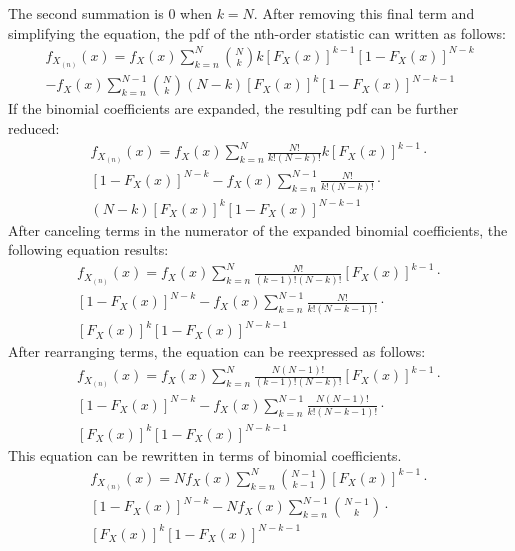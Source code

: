 \documentclass[conference]{IEEEtran}
\begin{document}
The second summation is 0 when $k=N$. After removing this final term and simplifying the equation, the pdf of the nth-order statistic can written as follows:
\begin{equation}
\begin{gathered}
f_{X_{(n)}}(x) = f_X(x)\sum_{k=n}^{N}\binom{N}{k}k[F_X(x)]^{k-1}[1-F_X(x)]^{N-k}\\
- f_X(x)\sum_{k=n}^{N-1}\binom{N}{k}(N-k)[F_X(x)]^{k}[1-F_X(x)]^{N-k-1}
\end{gathered}
\end{equation}
If the binomial coefficients are expanded, the resulting pdf can be further reduced:
\begin{equation}
\begin{gathered}
f_{X_{(n)}}(x) = f_X(x)\sum_{k=n}^{N}\frac{N!}{k!(N-k)!}k[F_X(x)]^{k-1}\cdot\\
[1-F_X(x)]^{N-k} - f_X(x)\sum_{k=n}^{N-1}\frac{N!}{k!(N-k)!}\cdot\\
(N-k)[F_X(x)]^{k}[1-F_X(x)]^{N-k-1}
\end{gathered}
\end{equation}
After canceling terms in the numerator of the expanded binomial coefficients, the following equation results:
\begin{equation}
\begin{gathered}
f_{X_{(n)}}(x) = f_X(x)\sum_{k=n}^{N}\frac{N!}{(k-1)!(N-k)!}[F_X(x)]^{k-1}\cdot\\
[1-F_X(x)]^{N-k} - f_X(x)\sum_{k=n}^{N-1}\frac{N!}{k!(N-k-1)!}\cdot\\
[F_X(x)]^{k}[1-F_X(x)]^{N-k-1}
\end{gathered}
\end{equation}
After rearranging terms, the equation can be reexpressed as follows:
\begin{equation}
\begin{gathered}
f_{X_{(n)}}(x) = f_X(x)\sum_{k=n}^{N}\frac{N(N-1)!}{(k-1)!(N-k)!}[F_X(x)]^{k-1}\cdot\\
[1-F_X(x)]^{N-k} - f_X(x)\sum_{k=n}^{N-1}\frac{N(N-1)!}{k!(N-k-1)!}\cdot\\
[F_X(x)]^{k}[1-F_X(x)]^{N-k-1}
\end{gathered}
\end{equation}
This equation can be rewritten in terms of binomial coefficients.
\begin{equation}
\begin{gathered}
f_{X_{(n)}}(x) = Nf_X(x)\sum_{k=n}^{N}\binom{N-1}{k-1}[F_X(x)]^{k-1}\cdot\\
[1-F_X(x)]^{N-k} - Nf_X(x)\sum_{k=n}^{N-1}\binom{N-1}{k}\cdot\\
[F_X(x)]^{k}[1-F_X(x)]^{N-k-1}
\end{gathered}
\end{equation}
\end{document}
